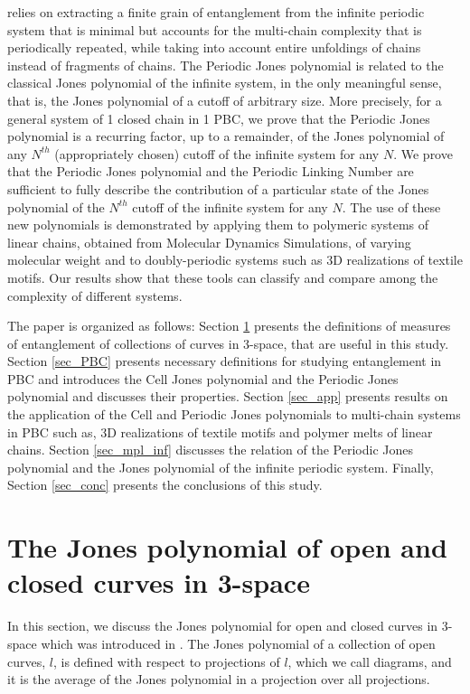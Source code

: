 \documentclass{article}
\begin{document}
relies on extracting a finite grain of entanglement from the infinite periodic system that is minimal but accounts for the multi-chain complexity that is periodically repeated, while taking into account entire unfoldings of chains instead of fragments of chains. The Periodic Jones polynomial is related to the classical Jones polynomial of the infinite system, in the only meaningful sense, that is, the Jones polynomial of a cutoff of arbitrary size. More precisely, for a general system of 1 closed chain in 1 PBC,  we prove that the Periodic Jones polynomial is a recurring factor, up to a remainder, of the Jones polynomial of any $N^{th}$ (appropriately chosen) cutoff of the infinite system for any $N$. We prove that the Periodic Jones polynomial and the Periodic Linking Number are sufficient to fully describe the contribution of a particular state of the Jones polynomial of the $N^{th}$ cutoff of the infinite system for any $N$. The use of these new polynomials is demonstrated by applying them to polymeric systems of linear chains, obtained from Molecular Dynamics Simulations, of varying molecular weight and to doubly-periodic systems such as 3D realizations of textile motifs. Our results show that these tools can classify and compare among the complexity of different systems.

The paper is organized as follows: Section \ref{sec_prelim_defs} presents the definitions of measures of entanglement of collections of curves in 3-space, that are useful in this study. Section \ref{sec_PBC} presents necessary definitions for studying entanglement in PBC and introduces the Cell Jones polynomial and the Periodic Jones polynomial and discusses their properties. Section \ref{sec_app} presents results on the application of the Cell and Periodic Jones polynomials to multi-chain systems in PBC such as, 3D realizations of textile motifs and  polymer melts of linear chains. Section \ref{sec_mpl_inf} discusses the relation of the Periodic Jones polynomial and the Jones polynomial of the  infinite periodic system. Finally, Section \ref{sec_conc} presents the conclusions of this study.
\section{The Jones polynomial of open and closed curves in 3-space}\label{sec_prelim_defs}

In this section, we discuss the Jones polynomial for open and closed curves in 3-space which was introduced in \cite{Barkataki2022,Panagiotou2020}. The Jones polynomial of a collection of open curves, $l$, is defined with respect to projections of $l$, which we call diagrams, and it is the average of the Jones polynomial in a projection over all projections.
\end{document}
